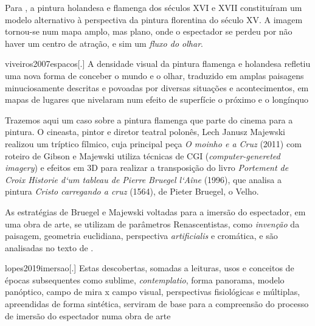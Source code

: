 Para \textcite{viveiros2007espacos}, a pintura holandesa e flamenga dos
séculos XVI e XVII constituíram um modelo alternativo à perspectiva da
pintura florentina do século XV. A imagem tornou-se num mapa amplo, mas
plano, onde o espectador se perdeu por não haver um centro de atração,
e sim um \emph{fluxo do olhar}. \parencite{viveiros2007espacos}

\begin{displaycquote}[38]{viveiros2007espacos}[.]
	A densidade visual da pintura flamenga e holandesa refletiu uma nova
	forma de conceber o mundo e o olhar, traduzido em amplas paisagens
	minuciosamente descritas e povoadas por diversas situações e
	acontecimentos, em mapas de lugares que nivelaram num efeito de
	superfície o próximo e o longínquo
\end{displaycquote}

Trazemos aqui um caso sobre a pintura flamenga que parte do cinema para
a pintura. O cineasta, pintor e diretor teatral polonês, Lech Janusz
Majewski realizou um tríptico fílmico, cuja principal peça \emph{O
	moinho e a Cruz} (2011) com roteiro de Gibson e Majewski utiliza
técnicas de CGI (\emph{computer-genereted imagery}) e efeitos em 3D
para realizar a transposição do livro \emph{Portement de Croix Historie
	d`um tableau de Pierre Bruegel l`Aîne} (1996), que analisa a pintura
\emph{Cristo carregando a cruz} (1564), de Pieter Bruegel, o Velho.

As estratégias de Bruegel e Majewski voltadas para a imersão do
espectador, em uma obra de arte, se utilizam de parâmetros
Renascentistas, como \emph{invenção} da paisagem, geometria euclidiana,
perspectiva \emph{artificialis} e cromática, e são analisadas no texto
de \textcite{lopes2019imersao}.

\begin{displaycquote}{lopes2019imersao}[.]
	Estas descobertas, somadas a leituras, usos e conceitos de épocas
	subsequentes como sublime, \emph{contemplatio}, forma panorama, modelo
	panóptico, campo de mira x campo visual, perspectivas fisiológicas e
	múltiplas, apreendidas de forma sintética, serviram de base para a
	compreensão do processo de imersão do espectador numa obra de arte
\end{displaycquote}

